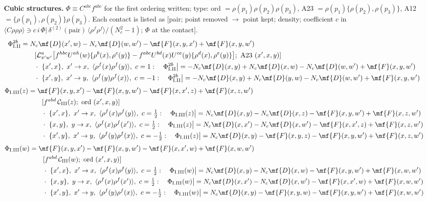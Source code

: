 \noindent\textbf{Cubic structures.} $\Phi\equiv C^{abc}f^{abc}$ for the first ordering written; type: ord $=\rho(p_{1})\rho(p_{2})\rho(p_{3})$, A23 $=\rho(p_{1})\{\rho(p_{2}),\rho(p_{3})\}$, A12 $=\{\rho(p_{1}),\rho(p_{2})\}\rho(p_{3})$. Each contact is listed as [pair; point removed $\to$ point kept; density; coefficient $c$ in $\langle C\rho\rho\rho\rangle\ni c\,i\,\Phi|\,\delta^{(2)}(\text{pair})\,\langle\rho^{f}\rho^{f}\rangle/(N_{c}^{2}-1)$; $\Phi$ at the contact].
\begin{align}
\Phi_{\rm I.II}^{2b}&=N_{c}\mf{D}(x',w)-N_{c}\mf{D}(w,w')-\mf{F}(x,y,x')+\mf{F}(x,y,w')\notag\\&\qquad[\mathcal{L}^{a}_{x'w'}\big[f^{hbc}U^{ah}(w)\{\rho^{b}(x),\rho^{c}(y)\}-f^{abc}U^{bd}(x)U^{ce}(y)\{\rho^{d}(x),\rho^{e}(y)\}\big];\ \text{A23}\ (x',x,y)]\notag\\
&\qquad\cdot\ \{x',x\},\ x'\to x,\ \langle\rho^{f}(x)\rho^{f}(y)\rangle,\ c=1:\quad \Phi_{\rm I.II}^{2b}\big|=-N_{c}\mf{D}(x,y)+N_{c}\mf{D}(x,w)-N_{c}\mf{D}(w,w')+\mf{F}(x,y,w')\notag\\
&\qquad\cdot\ \{x',y\},\ x'\to y,\ \langle\rho^{f}(y)\rho^{f}(x)\rangle,\ c=-1:\quad \Phi_{\rm I.II}^{2b}\big|=-N_{c}\mf{D}(x,y)+N_{c}\mf{D}(y,w)-N_{c}\mf{D}(w,w')+\mf{F}(x,y,w')\notag
\end{align}
\begin{align}
\Phi_{\rm I.III}(z)&=\mf{F}(x,y,x')-\mf{F}(x,y,w')-\mf{F}(x,x',z)+\mf{F}(x,z,w')\notag\\&\qquad[f^{abd}\,\mathcal{C}_{\rm III}(z);\ \text{ord}\ (x',x,y)]\notag\\
&\qquad\cdot\ \{x',x\},\ x'\to x,\ \langle\rho^{f}(x)\rho^{f}(y)\rangle,\ c=\tfrac{1}{2}:\quad \Phi_{\rm I.III}(z)\big|=N_{c}\mf{D}(x,y)-N_{c}\mf{D}(x,z)-\mf{F}(x,y,w')+\mf{F}(x,z,w')\notag\\
&\qquad\cdot\ \{x,y\},\ y\to x,\ \langle\rho^{f}(x)\rho^{f}(x')\rangle,\ c=\tfrac{1}{2}:\quad \Phi_{\rm I.III}(z)\big|=N_{c}\mf{D}(x,x')-N_{c}\mf{D}(x,w')-\mf{F}(x,x',z)+\mf{F}(x,z,w')\notag\\
&\qquad\cdot\ \{x',y\},\ x'\to y,\ \langle\rho^{f}(y)\rho^{f}(x)\rangle,\ c=-\tfrac{1}{2}:\quad \Phi_{\rm I.III}(z)\big|=N_{c}\mf{D}(x,y)-\mf{F}(x,y,z)-\mf{F}(x,y,w')+\mf{F}(x,z,w')\notag
\end{align}
\begin{align}
\Phi_{\rm I.III}(w)&=\mf{F}(x,y,x')-\mf{F}(x,y,w')-\mf{F}(x,x',w)+\mf{F}(x,w,w')\notag\\&\qquad[f^{abd}\,\mathcal{C}_{\rm III}(w);\ \text{ord}\ (x',x,y)]\notag\\
&\qquad\cdot\ \{x',x\},\ x'\to x,\ \langle\rho^{f}(x)\rho^{f}(y)\rangle,\ c=\tfrac{1}{2}:\quad \Phi_{\rm I.III}(w)\big|=N_{c}\mf{D}(x,y)-N_{c}\mf{D}(x,w)-\mf{F}(x,y,w')+\mf{F}(x,w,w')\notag\\
&\qquad\cdot\ \{x,y\},\ y\to x,\ \langle\rho^{f}(x)\rho^{f}(x')\rangle,\ c=\tfrac{1}{2}:\quad \Phi_{\rm I.III}(w)\big|=N_{c}\mf{D}(x,x')-N_{c}\mf{D}(x,w')-\mf{F}(x,x',w)+\mf{F}(x,w,w')\notag\\
&\qquad\cdot\ \{x',y\},\ x'\to y,\ \langle\rho^{f}(y)\rho^{f}(x)\rangle,\ c=-\tfrac{1}{2}:\quad \Phi_{\rm I.III}(w)\big|=N_{c}\mf{D}(x,y)-\mf{F}(x,y,w)-\mf{F}(x,y,w')+\mf{F}(x,w,w')\notag
\end{align}
